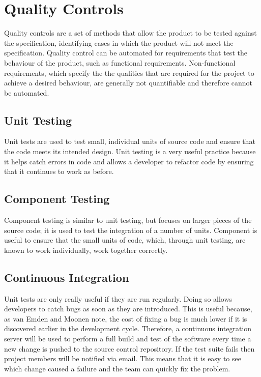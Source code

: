 \section{Quality Controls}
\label{section:quality}

Quality controls are a set of methods that allow the product to be tested against the specification, identifying cases in which the product will not meet the specification.
Quality control can be automated for requirements that test the behaviour of the product, such as functional requirements. Non-functional requirements, which specify the the qualities that are required for the project to achieve a desired behaviour, are generally not quantifiable and therefore cannot be automated.



% 

\subsection{Unit Testing}
Unit tests are used to test small, individual units of source code and ensure that the
code meets its intended design. Unit testing is a very useful practice because it helps
catch errors in code and allows a developer to refactor code by ensuring that it continues
to work as before.


\subsection{Component Testing}
Component testing is similar to unit testing, but focuses on larger pieces of the source
code; it is used to test the integration of a number of units. Component is useful to
ensure that the small units of code, which, through unit testing, are known to work
individually, work together correctly.

\subsection{Continuous Integration}
Unit tests are only really useful if they are run regularly. Doing so allows developers
to catch bugs as soon as they are introduced. This is useful because, as van Emden
and Moonen note, the cost of fixing a bug is much lower if it is discovered earlier in
the development cycle.\cite{emden2002} Therefore, a continuous integration server
will be used to perform a full build and test of the software every time a new change
is pushed to the source control repository. If the test suite fails then project members
will be notified via email. This means that it is easy to see which change caused a
failure and the team can quickly fix the problem.

